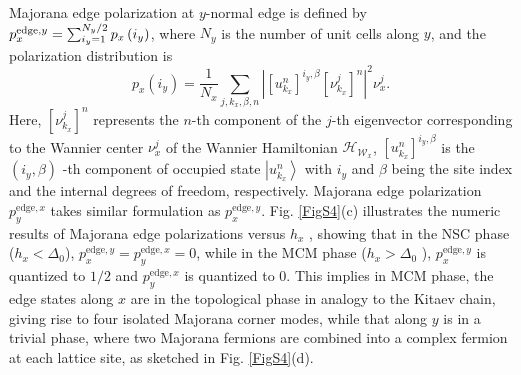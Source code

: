 \documentclass[twocolumn,prl,floatfix,citeautoscript,nofootinbib,superscriptaddress]{revtex4}
\begin{document}
Majorana edge polarization at $y$-normal edge is defined by $p_{x}^{\mathrm{%
edge},y}=\sum_{i_{y}=1}^{N_{y}/2}p_{x}\left( i_{y}\right) $, where $N_{y}$
is the number of unit cells along $y$, and the polarization distribution is%
\begin{equation}
p_{x}\left( i_{y}\right) =\frac{1}{N_{x}}\sum_{j,k_{x},\beta ,n}\left\vert %
\left[ u_{k_{x}}^{n}\right] ^{i_{y},\beta }\left[ \nu _{k_{x}}^{j}\right]
^{n}\right\vert ^{2}\nu _{x}^{j}.
\end{equation}%
Here, $\left[ \nu _{k_{x}}^{j}\right] ^{n}$ represents the $n$-th component
of the $j$-th eigenvector corresponding to the Wannier center $\nu _{x}^{j}$
of the Wannier Hamiltonian $\mathcal{H}_{\mathcal{W}_{x}}$, $\left[
u_{k_{x}}^{n}\right] ^{i_{y},\beta }$ is the $\left( i_{y},\beta \right) $%
-th component of occupied state $\left\vert u_{k_{x}}^{n}\right\rangle $
with $i_{y}$ and $\beta $ being the site index and the internal degrees of
freedom, respectively. Majorana edge polarization $p_{y}^{\mathrm{edge},x}$
takes similar formulation as $p_{x}^{\mathrm{edge},y}$. Fig. \ref{FigS4}(c)
illustrates the numeric results of Majorana edge polarizations versus $h_{x}$%
, showing that in the NSC phase ($h_{x}<\Delta _{0}$), $p_{x}^{\mathrm{edge}%
,y}=p_{y}^{\mathrm{edge},x}=0$, while in the MCM phase ($h_{x}>\Delta _{0}$%
), $p_{x}^{\mathrm{edge},y}$ is quantized to $1/2$ and $p_{y}^{\mathrm{edge}%
,x}$ is quantized to $0$. This implies in MCM phase, the edge states along $%
x $ are in the topological phase in analogy to the Kitaev chain, giving rise
to four isolated Majorana corner modes, while that along $y$ is in a trivial
phase, where two Majorana fermions are combined into a complex fermion at
each lattice site, as sketched in Fig. \ref{FigS4}(d).
\end{document}
